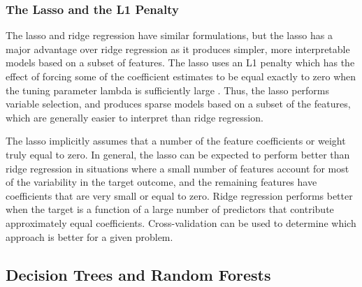 \documentclass[sigconf]{acmart}
\begin{document}
\subsubsection{The Lasso and the L1 Penalty} 

The lasso and ridge regression have similar formulations, but the lasso has a 
major advantage over ridge regression as it produces simpler, more interpretable
models based on a subset of features. The lasso uses an L1 penalty which has the 
effect of forcing some of the coefficient estimates to be equal exactly to zero 
when the tuning parameter lambda is sufficiently large \cite{statlearn13}. Thus, 
the lasso performs variable selection, and produces sparse models based on a 
subset of the features, which are generally easier to interpret than ridge 
regression. 



The lasso implicitly assumes that a number of the feature coefficients or
weight truly equal to zero. In general, the lasso can be expected to perform
better than ridge regression in situations where a small number of features
account for most of the variability in the target outcome, and the remaining
features have coefficients that are very small or equal to zero. Ridge 
regression performs better when the target is a function of a large number of 
predictors that contribute approximately equal coefficients. Cross-validation
can be used to determine which approach is better for a given problem. 


\subsection{Decision Trees and Random Forests}
\end{document}

